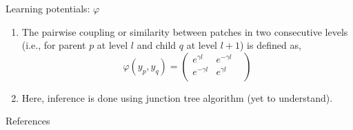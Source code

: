 \documentclass{beamer}
\begin{document}
\begin{frame}{Learning potentials: $\varphi$}
  \begin{enumerate}
    \item The pairwise coupling or similarity between patches in two consecutive levels (i.\thinspace e., for parent $p$ at level $l$ and child $q$ at level $l+1$) is defined as,
  \begin{equation}
  \varphi(y_p, y_q) = \begin{pmatrix}
  e^{\gamma l} &   e^{-\gamma l} & \\
  e^{-\gamma l} &   e^{\gamma l} & \\
  \end{pmatrix}  
  \end{equation}
  \item Here, inference is done using junction tree algorithm (yet to understand).
  \end{enumerate}
\end{frame}

\tiny
\begin{frame}{References}


\end{frame}
\end{document}
